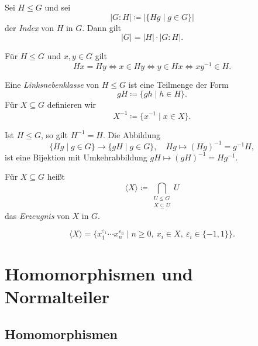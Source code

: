 \documentclass[11pt]{article}
\begin{document}
\begin{theorem}[Lagrange]\Theorem
  Sei $H \le G$ und sei
  \[ \lvert G : H \rvert \coloneqq \lvert \{Hg \mid g \in G\} \rvert \]
  der \emph{Index} von $H$ in $G$. Dann gilt
  \[ \lvert G \rvert = \lvert H \rvert \cdot \lvert G : H \rvert. \]
\end{theorem}


\begin{lemma}
  Für $H \le G$ und $x, y \in G$ gilt
  \[ Hx = Hy \iff x \in Hy \iff y \in Hx \iff xy^{-1} \in H. \]
\end{lemma}


\begin{definition}[Linksnebenklasse]\Theorem
  Eine \emph{Linksnebenklasse} von $H \le G$ ist eine Teilmenge der Form
  \[ gH \coloneqq \{gh \mid h \in H\}. \]
  Für $X \subseteq G$ definieren wir
  \[ X^{-1} \coloneqq \{x^{-1} \mid x \in X\}. \]
\end{definition}


Ist $H \le G$, so gilt $H^{-1} = H$. Die Abbildung
\[ \{Hg \mid g \in G\} \longrightarrow \{gH \mid g \in G\}, \quad Hg \longmapsto (Hg)^{-1} = g^{-1}H, \]
ist eine Bijektion mit Umkehrabbildung $gH \longmapsto (gH)^{-1} = Hg^{-1}$.


\begin{definition}[Erzeugnis]\Theorem
  Für $X \subseteq G$ heißt
  \[ \langle X \rangle \coloneqq \bigcap_{\substack{U \le G \\ X \subseteq U}} U \]
  das \emph{Erzeugnis} von $X$ in $G$.
\end{definition}


\begin{lemma}
  \[ \langle X \rangle = \{x_1^{\varepsilon_1} \dotsm x_n^{\varepsilon_n} \mid n \ge 0,\ x_i \in X,\ \varepsilon_i \in \{-1, 1\}\}. \]
\end{lemma}

\section{Homomorphismen und Normalteiler}

\subsection{Homomorphismen}
\end{document}
